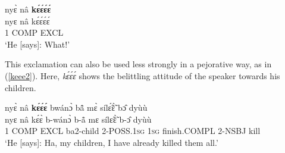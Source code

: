 \begin{exe} 
\ex\label{keee1}
  \glll nyɛ̀ nâ {\bfseries kɛ́ɛ́ɛ́ɛ́} \\
        nyɛ nâ kɛ́ɛ́ɛ́ɛ́ \\
       1 COMP EXCL  \\
    \trans `He [says]: What!'
\end{exe}

This exclamation can also be used less strongly in a pejorative way, as in (\ref{keee2}). Here, {\itshape kɛ́ɛ́ɛ́} shows the belittling attitude of the speaker towards his children.

\begin{exe} 
\ex\label{keee2}
  \glll  nyɛ̀ nâ {\bfseries kɛ́ɛ́ɛ́} bwánɔ̀ bã̂ mɛ̀ sílɛ̃́ɛ̃̀ bɔ̂ dyùù \\
        nyɛ nâ kɛ́ɛ̀ b-wánɔ̀ b-ã̊ mɛ sílɛ̃ɛ̃̀ b-ɔ̂ dyùù \\
        1 COMP EXCL ba2-child 2-POSS.1\textsc{sg} 1\textsc{sg} finish.COMPL 2-NSBJ kill \\
    \trans `He [says]: Ha, my children, I have already killed them all.'
\end{exe}





